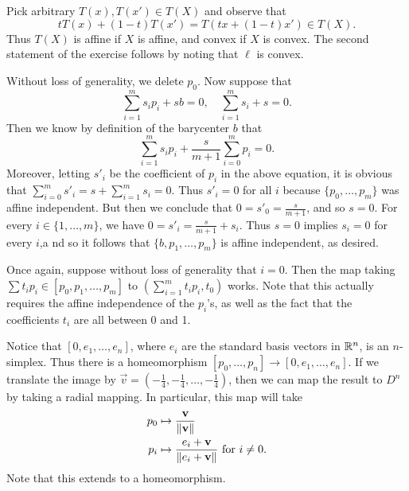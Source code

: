 \documentclass[../../solutions.tex]{subfiles}
\begin{document}
\begin{exercise} \leavevmode
Pick arbitrary $T(x),T(x')\in T(X)$ and observe that \[tT(x)+(1-t)T(x')=T(tx+(1-t)x')\in T(X).\] Thus $T(X)$ is affine if $X$ is affine, and convex if $X$ is convex. The second statement of the exercise follows by noting that $\ell$ is convex. 
\end{exercise} 

\begin{exercise} \leavevmode
Without loss of generality, we delete $p_0$. Now suppose that \[\sum_{i=1}^ms_ip_i+sb=0,\quad\sum_{i=1}^ms_i+s=0.\] Then we know by definition of the barycenter $b$ that \[\sum_{i=1}^ms_ip_i+\frac s{m+1}\sum_{i=0}^mp_i=0.\] Moreover, letting $s'_i$ be the coefficient of $p_i$ in the above equation, it is obvious that $\sum_{i=0}^ms'_i=s+\sum_{i=1}^ms_i=0$. Thus $s'_i=0$ for all $i$ because $\{p_0,\dots,p_m\}$ was affine independent. But then we conclude that $0=s'_0=\frac s{m+1}$, and so $s=0$. For every $i\in\{1,\dots,m\}$, we have $0=s'_i=\frac s{m+1}+s_i$. Thus $s=0$ implies $s_i=0$ for every $i$,a nd so it follows that $\{b,p_1,\dots,p_m\}$ is affine independent, as desired.
\end{exercise} 

\begin{exercise} \leavevmode
Once again, suppose without loss of generality that $i=0$. Then the map taking $\sum t_ip_i\in[p_0,p_1,\dots,p_m]$ to $\left(\sum_{i=1}^mt_ip_i,t_0\right)$ works. Note that this actually requires the affine independence of the $p_i$'s, as well as the fact that the coefficients $t_i$ are all between 0 and 1. 
\end{exercise} 

\begin{exercise} \leavevmode
Notice that $[0,e_1,\dots,e_n]$, where $e_i$ are the standard basis vectors in $\mathbb{R}^n$, is an $n$-simplex. Thus there is a homeomorphism $[p_0,\dots,p_n]\to[0,e_1,\dots,e_n]$. If we translate the image by $\vec v=(-\frac14,-\frac14,\dots,-\frac14)$, then we can map the result to $D^n$ by taking a radial mapping. In particular, this map will take \begin{align*}p_0&\mapsto\frac{\mathbf v}{\lVert\mathbf v\rVert}\\p_i&\mapsto\frac{e_i+\mathbf v}{\lVert e_i+\mathbf v\rVert}~\text{for}~i\ne0.\end{align*} Note that this extends to a homeomorphism. 
\end{exercise} 
\end{document}
